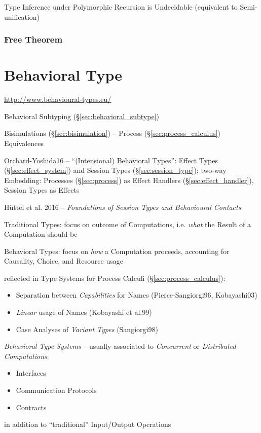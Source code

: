 Type Inference under Polymorphic Recursion is Undecidable (equivalent
to Semi-unification) %



\subsubsection{Free Theorem}\label{sec:free_theorem}



\section{Behavioral Type}\label{sec:behavioral_type}

\url{http://www.behavioural-types.eu/}

\fist Behavioral Subtyping (\S\ref{sec:behavioral_subtype})

\fist Bisimulations (\S\ref{sec:bisimulation}) -- Process
(\S\ref{sec:process_calculus}) Equivalences

Orchard-Yoshida16 \cite{orchard-yoshida16} -- ``(Intensional)
Behavioral Types'': Effect Types (\S\ref{sec:effect_system}) and
Session Types (\S\ref{sec:session_type}); two-way Embedding: Processes
(\S\ref{sec:process}) as Effect Handlers (\S\ref{sec:effect_handler}),
Session Types as Effects


\asterism


H\"uttel et al. 2016 --
\emph{Foundations of Session Types and Behavioural Contacts}

Traditional Types: focus on outcome of Computations, i.e. \emph{what}
the Result of a Computation should be

Behavioral Types: focus on \emph{how} a Computation proceeds,
accounting for Causality, Choice, and Resource usage

reflected in Type Systems for Process Calculi
(\S\ref{sec:process_calculus}):
\begin{itemize}
  \item Separation between \emph{Capabilities} for Names
    (Pierce-Sangiorgi96, Kobayashi03)
  \item \emph{Linear} usage of Names (Kobayashi et al.99)
  \item Case Analyses of \emph{Variant Types} (Sangiorgi98)
\end{itemize}

\emph{Behavioral Type Systems} -- usually associated to
\emph{Concurrent} or \emph{Distributed Computations}:
\begin{itemize}
  \item Interfaces
  \item Communication Protocols
  \item Contracts
\end{itemize}
in addition to ``traditional'' Input/Output Operations

